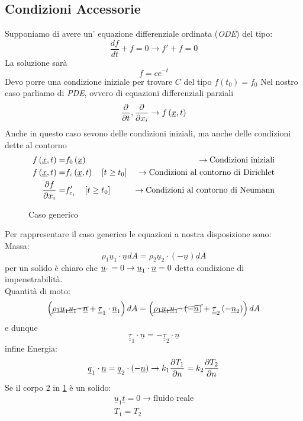 \subsection{Condizioni Accessorie}
Supponiamo di avere un' equazione differenziale ordinata (\emph{ODE}) del tipo:
\[
\frac{df}{dt}+f = 0 \to f'+f=0 
\]
La soluzione sarà
\[
f = ce^{-t}
\]
Devo porre una condizione iniziale per trovare $ C $ del tipo $ f\left( t_0\right) =f_0 $
Nel nostro caso parliamo di \emph{PDE}, ovvero di equazioni differenziali parziali
\[
\frac{\partial}{\partial t},\frac{\partial}{\partial x_i}\to f\left( \underline{x},t\right) 
\]
Anche in questo caso sevono delle condizioni iniziali, ma anche delle condizioni dette al contorno
\begin{align*}
  f\left( \underline{x},t\right)  =&f_0\left( \underline{x}\right) &\to \text{Condizioni iniziali}\\
  f\left( \underline{x},t\right)  =&f_c\left( \underline{x},t\right)\quad \left[ t\geq t_0\right]  &\to \text{Condizioni al contorno di Dirichlet}\\
  \frac{\partial f}{\partial x_i}=&f'_{c_i}\quad \left[ t\geq t_0\right]  &\to \text{Condizioni al contorno di Neumann}
\end{align*}
\begin{figure}[H]
  \centering
  \caption{Caso generico}
  \label{fig:cilinder_fluid}
\end{figure}
Per rappresentare il caso generico le equazioni a nostra disposizione sono:\\
Massa:
\[
\rho_1 \underline{u}_1\cdot \underline{n}dA =\rho_2 \underline{u}_2\cdot \left( -\underline{n}\right) dA
\]
per un solido è chiaro che $ \underline{u}_" = 0\to \underline{u}_1 \cdot \underline{n} = 0 $ detta condizione di impenetrabilità.\\
Quantità di moto:
\[
\left( \cancel{\rho _1 \underline{u}_1 \underline{u}_1 \cdot \underline{n}} +\underline{\underline{\tau}}_1 \cdot \underline{n}_1 \right) dA = \left( \cancel{\rho _1 \underline{u}_1 \underline{u}_1 \cdot \left( -\underline{n}\right) } +\underline{\underline{\tau}}_2 \left( -\underline{n}_2\right) \right) dA
\]
e dunque
\[
\underline{\underline{\tau}}_1 \cdot \underline{n} = - \underline{\underline{\tau}}_2 \cdot \underline{n} 
\]
infine Energia:
\[
\underline{q}_1 \cdot \underline{n}=\underline{q}_2 \cdot \left( -\underline{n}\right) \to k_1 \frac{\partial T_1}{\partial n} = k_2\frac{\partial T_2}{\partial n}
\]
Se il corpo 2 in \cref{fig:cilinder_fluid} è un solido:
\begin{gather*}
  \underline{u}_1 \underline{t} = 0 \to \text{fluido reale}\\
  T_1 = T_2
\end{gather*}



